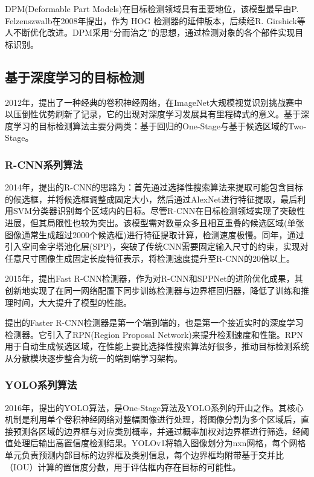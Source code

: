 DPM(Deformable Part Models)在目标检测领域具有重要地位，该模型最早由P. Felzenszwalb在2008年提出\cite{Felzenszwalb2008}，作为 HOG 检测器的延伸版本，后续经R. Girshick等人不断优化改进\cite{Felzenszwalb2010Cascade}。DPM采用“分而治之”的思想，通过检测对象的各个部件实现目标识别。

\subsection{基于深度学习的目标检测}
2012年，\textcite{alexNet}提出了一种经典的卷积神经网络，在ImageNet大规模视觉识别挑战赛中以压倒性优势刷新了记录，它的出现对深度学习发展具有里程碑式的意义。基于深度学习的目标检测算法主要分两类：基于回归的One-Stage与基于候选区域的Two-Stage。

\subsubsection{R-CNN系列算法}
2014年，\textcite{rcnn}提出的R-CNN的思路为：首先通过选择性搜索\cite{selectSearch}算法来提取可能包含目标的候选框，并将候选框调整成固定大小，然后通过AlexNet进行特征提取，最后利用SVM分类器识别每个区域内的目标。尽管R-CNN在目标检测领域实现了突破性进展，但其局限性也较为突出。该模型需对数量众多且相互重叠的候选区域(单张图像通常生成超过2000个候选框)进行特征提取计算，检测速度极慢。同年，\textcite{sppnet}通过引入空间金字塔池化层(SPP)，突破了传统CNN需要固定输入尺寸的约束，实现对任意尺寸图像生成固定长度特征表示，将检测速度提升至R-CNN的20倍以上。

2015年，\textcite{fast-rcnn}提出Fast R-CNN检测器，作为对R-CNN和SPPNet的进阶优化成果，其创新地实现了在同一网络配置下同步训练检测器与边界框回归器，降低了训练和推理时间，大大提升了模型的性能。

\textcite{faster-rcnn}提出的Faster R-CNN检测器是第一个端到端的，也是第一个接近实时的深度学习检测器。它引入了RPN(Region Proposal Network)来提升检测速度和性能。RPN用于自动生成候选区域，在性能上要比选择性搜索算法好很多，推动目标检测系统从分散模块逐步整合为统一的端到端学习架构。


\subsubsection{YOLO系列算法}
2016年，\textcite{yolo}提出的YOLO算法，是One-Stage算法及YOLO系列的开山之作。其核心机制是利用单个卷积神经网络对整幅图像进行处理，将图像分割为多个区域后，直接预测各区域的边界框与对应类别概率，并通过概率加权对边界框进行筛选，经阈值处理后输出高置信度检测结果。YOLOv1将输入图像划分为nxn网格，每个网格单元负责预测内部目标的边界框及类别信息，每个边界框均附带基于交并比（IOU）计算的置信度分数，用于评估框内存在目标的可能性。


